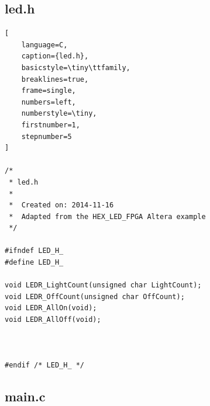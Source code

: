\documentclass[conference]{IEEEtran}
\begin{document}
\subsection{led.h}

\begin{lstlisting}[
    language=C, 
    caption={led.h}, 
    basicstyle=\tiny\ttfamily, 
    breaklines=true, 
    frame=single, 
    numbers=left, 
    numberstyle=\tiny, 
    firstnumber=1, 
    stepnumber=5
]

/*
 * led.h
 *
 *  Created on: 2014-11-16
 * 	Adapted from the HEX_LED_FPGA Altera example
 */

#ifndef LED_H_
#define LED_H_

void LEDR_LightCount(unsigned char LightCount);
void LEDR_OffCount(unsigned char OffCount);
void LEDR_AllOn(void);
void LEDR_AllOff(void);



#endif /* LED_H_ */

\end{lstlisting}


\subsection{main.c}
\end{document}
